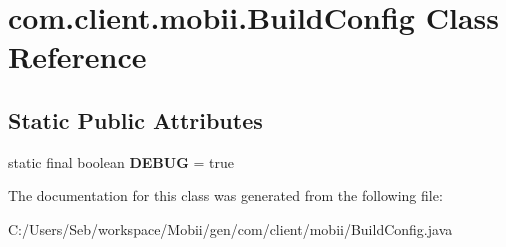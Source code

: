 \hypertarget{classcom_1_1client_1_1mobii_1_1_build_config}{\section{com.\-client.\-mobii.\-Build\-Config Class Reference}
\label{classcom_1_1client_1_1mobii_1_1_build_config}
}
\subsection*{Static Public Attributes}
\begin{DoxyCompactItemize}
\item 
\hypertarget{classcom_1_1client_1_1mobii_1_1_build_config_a5d8e1802df997b5e1ced7e348a819de1}{static final boolean {\bfseries D\-E\-B\-U\-G} = true}\label{classcom_1_1client_1_1mobii_1_1_build_config_a5d8e1802df997b5e1ced7e348a819de1}

\end{DoxyCompactItemize}


The documentation for this class was generated from the following file\-:\begin{DoxyCompactItemize}
\item 
C\-:/\-Users/\-Seb/workspace/\-Mobii/gen/com/client/mobii/Build\-Config.\-java\end{DoxyCompactItemize}
